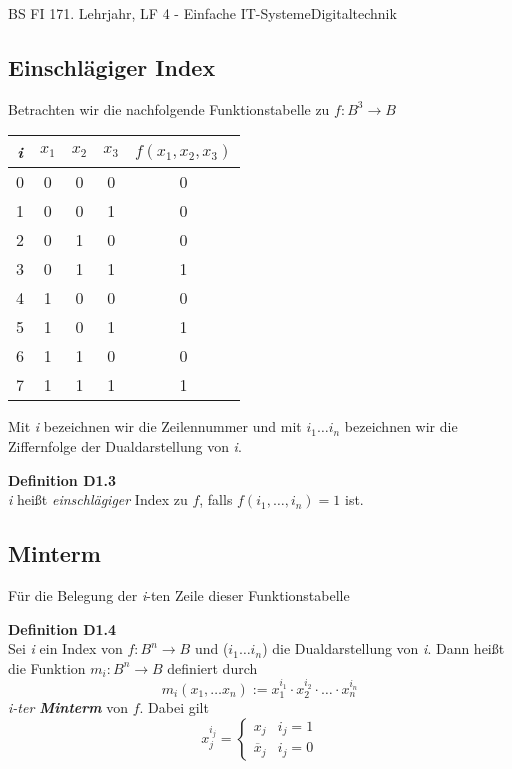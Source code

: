 \documentclass[11pt,twocolumn,oneside,openany,headings=optiontotoc,11pt,numbers=noenddot]{article}
\begin{document}
\begin{worksheet}{BS FI 17}{1. Lehrjahr, LF 4 - Einfache IT-Systeme}{Digitaltechnik}
		\subsection{Einschlägiger Index}
		Betrachten wir die nachfolgende Funktionstabelle zu \(f: B^3 \rightarrow B\)
		\begin{center}
			\begin{tabular}{|c|ccc|c|}
				\hline
				\textit{i} & \(x_1\) & \(x_2\) & \(x_3\) & \(f(x_1,x_2,x_3)\)\\
				\hline
				0 & 0 & 0 & 0 & 0\\
				\hline
				1 & 0 & 0 & 1 & 0\\
				\hline
				2 & 0 & 1 & 0 & 0\\
				\hline
				3 & 0 & 1 & 1 & 1\\
				\hline
				4 & 1 & 0 & 0 & 0\\
				\hline
				5 & 1 & 0 & 1 & 1\\
				\hline
				6 & 1 & 1 & 0 & 0\\
				\hline
				7 & 1 & 1 & 1 & 1\\
				\hline
			\end{tabular}
		\end{center}
		Mit \textit{i} bezeichnen wir die Zeilennummer und mit \(i_1 \ldots i_n\) bezeichnen wir die Ziffernfolge der Dualdarstellung von \textit{i}.
		\begin{framed}
			\textbf{Definition D1.3}\\ \textit{i} heißt \textit{einschlägiger} Index zu \(f\), falls \(f(i_1,\ldots,i_n) = 1\) ist.
		\end{framed}
		\subsection{Minterm}
		Für die Belegung der \textit{i}-ten Zeile dieser Funktionstabelle 
		\begin{framed}
			\textbf{Definition D1.4}\\ Sei \textit{i} ein Index von \(f: B^n \rightarrow B\) und (\(i_1\ldots i_n\)) die Dualdarstellung von \textit{i}. Dann heißt die Funktion \(m_i: B^n \rightarrow B\) definiert durch
			\[m_i(x_1,\ldots x_n) := x_{1}^{i_1}\cdot x_{2}^{i_2}\cdot\ldots\cdot x_{n}^{i_n}\]
			\textit{i-ter \textbf{Minterm}} von \(f\). Dabei gilt
			\[x_{j}^{i_j} = \begin{cases}x_j & i_j=1 \\ \overline x_j & i_j = 0\end{cases}\]
		\end{framed}

\end{worksheet}
\end{document}
